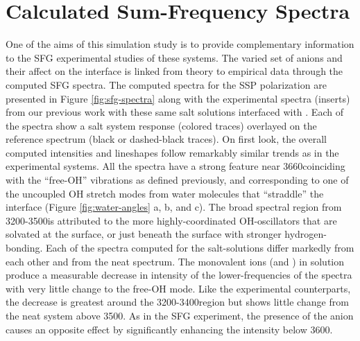 \section{Calculated Sum-Frequency Spectra}

One of the aims of this simulation study is to provide complementary information to the SFG experimental studies of these systems.\cite{McFearin2009} The varied set of anions and their affect on the \ctcwat interface is linked from theory to empirical data through the computed SFG spectra. The computed spectra for the SSP polarization are presented in Figure \ref{fig:sfg-spectra} along with the experimental spectra (inserts) from our previous work with these same salt solutions interfaced with \ctc.\cite{McFearin2009} Each of the spectra show a salt system response (colored traces) overlayed on the reference \ctcwat spectrum (black or dashed-black traces). On first look, the overall computed intensities and lineshapes follow remarkably similar trends as in the experimental systems. All the spectra have a strong feature near 3660\cm coinciding with the ``free-OH'' vibrations as defined previously,\cite{McFearin2009} and corresponding to one of the uncoupled OH stretch modes from water molecules that ``straddle'' the interface (Figure \ref{fig:water-angles} a, b, and c).\cite{McFearin2009} The broad spectral region from 3200-3500\cm is attributed to the more highly-coordinated OH-oscillators that are solvated at the surface, or just beneath the surface with stronger hydrogen-bonding. Each of the spectra computed for the salt-solutions differ markedly from each other and from the neat \ctcwat spectrum. The monovalent ions (\cl and \nit) in solution produce a measurable decrease in intensity of the lower-frequencies of the spectra with very little change to the free-OH mode. Like the experimental counterparts, the decrease is greatest around the 3200-3400\cm region but shows little change from the neat \ctcwat system above 3500\cm. As in the SFG experiment, the presence of the \sul anion causes an opposite effect by significantly enhancing the intensity below 3600\cm.

